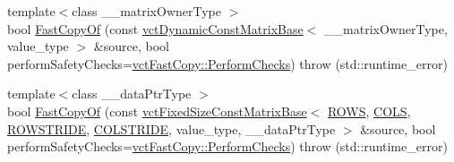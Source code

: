 {\bf }\par
\begin{DoxyCompactItemize}
\item 
{\footnotesize template$<$class \-\_\-\-\_\-matrix\-Owner\-Type $>$ }\\bool \hyperlink{classvct_fixed_size_matrix_base_af4b2a36b4660978a7bf76203f4f57b12}{Fast\-Copy\-Of} (const \hyperlink{classvct_dynamic_const_matrix_base}{vct\-Dynamic\-Const\-Matrix\-Base}$<$ \-\_\-\-\_\-matrix\-Owner\-Type, value\-\_\-type $>$ \&source, bool perform\-Safety\-Checks=\hyperlink{classvct_fast_copy_af2981ae09904d1a4dd9b2d19c86c6cd9}{vct\-Fast\-Copy\-::\-Perform\-Checks})  throw (std\-::runtime\-\_\-error)
\item 
{\footnotesize template$<$class \-\_\-\-\_\-data\-Ptr\-Type $>$ }\\bool \hyperlink{classvct_fixed_size_matrix_base_af61629d8b0fb88f8782bd8f82b2db81d}{Fast\-Copy\-Of} (const \hyperlink{classvct_fixed_size_const_matrix_base}{vct\-Fixed\-Size\-Const\-Matrix\-Base}$<$ \hyperlink{classvct_fixed_size_matrix_base_a939e2f4b06ffc96c2d9d9a27dcb9fa33ab17b61dd0080412b3f116710fdfcc928}{R\-O\-W\-S}, \hyperlink{classvct_fixed_size_matrix_base_a939e2f4b06ffc96c2d9d9a27dcb9fa33a977a8d137c1cd687cca56aaea7ecf08c}{C\-O\-L\-S}, \hyperlink{classvct_fixed_size_matrix_base_a7ca4cc289d4bd697476f2d37e82e9a38a6c561939f5de9c5e815b889df7662117}{R\-O\-W\-S\-T\-R\-I\-D\-E}, \hyperlink{classvct_fixed_size_matrix_base_a7ca4cc289d4bd697476f2d37e82e9a38a920a67cbcd917bab0e46677bf43cb6b8}{C\-O\-L\-S\-T\-R\-I\-D\-E}, value\-\_\-type, \-\_\-\-\_\-data\-Ptr\-Type $>$ \&source, bool perform\-Safety\-Checks=\hyperlink{classvct_fast_copy_af2981ae09904d1a4dd9b2d19c86c6cd9}{vct\-Fast\-Copy\-::\-Perform\-Checks})  throw (std\-::runtime\-\_\-error)
\end{DoxyCompactItemize}

